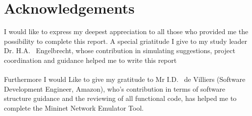 \chapter{Acknowledgements}

I would like to express my deepest  appreciation to all those who provided me the possibility to complete this report. A special 
griatitude I give to my study leader Dr. H.A. \ Engelbrecht, whose contribution in simulating suggestions,  project coordination and guidance
helped me to write this report\\\\
Furthermore I would Like to give my gratitude to Mr I.D. \ de Villiers (Software Development Engineer, Amazon), who's contribution in terms of software structure guidance and the reviewing of all functional code, has helped me to complete the Mininet Network Emulator Tool.
